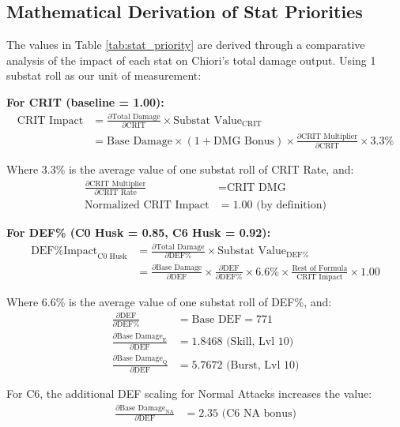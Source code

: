 \documentclass[12pt,a4paper]{article}
\begin{document}
\subsection{Mathematical Derivation of Stat Priorities}

The values in Table \ref{tab:stat_priority} are derived through a comparative analysis of the impact of each stat on Chiori's total damage output. Using 1 substat roll as our unit of measurement:

\textbf{For CRIT (baseline = 1.00):}
\begin{align}
\text{CRIT Impact} &= \frac{\partial \text{Total Damage}}{\partial \text{CRIT}} \times \text{Substat Value}_{\text{CRIT}} \\
&= \text{Base Damage} \times (1 + \text{DMG Bonus}) \times \frac{\partial \text{CRIT Multiplier}}{\partial \text{CRIT}} \times 3.3\%
\end{align}

Where 3.3\% is the average value of one substat roll of CRIT Rate, and:
\begin{align}
\frac{\partial \text{CRIT Multiplier}}{\partial \text{CRIT Rate}} &= \text{CRIT DMG} \\
\text{Normalized CRIT Impact} &= 1.00 \text{ (by definition)}
\end{align}

\textbf{For DEF\% (C0 Husk = 0.85, C6 Husk = 0.92):}
\begin{align}
\text{DEF\% Impact}_{\text{C0 Husk}} &= \frac{\partial \text{Total Damage}}{\partial \text{DEF\%}} \times \text{Substat Value}_{\text{DEF\%}} \\
&= \frac{\partial \text{Base Damage}}{\partial \text{DEF}} \times \frac{\partial \text{DEF}}{\partial \text{DEF\%}} \times 6.6\% \times \frac{\text{Rest of Formula}}{\text{CRIT Impact}} \times 1.00
\end{align}

Where 6.6\% is the average value of one substat roll of DEF\%, and:
\begin{align}
\frac{\partial \text{DEF}}{\partial \text{DEF\%}} &= \text{Base DEF} = 771 \\
\frac{\partial \text{Base Damage}_{\text{E}}}{\partial \text{DEF}} &= 1.8468 \text{ (Skill, Lvl 10)} \\
\frac{\partial \text{Base Damage}_{\text{Q}}}{\partial \text{DEF}} &= 5.7672 \text{ (Burst, Lvl 10)}
\end{align}

For C6, the additional DEF scaling for Normal Attacks increases the value:
\begin{align}
\frac{\partial \text{Base Damage}_{\text{NA}}}{\partial \text{DEF}} &= 2.35 \text{ (C6 NA bonus)}
\end{align}
\end{document}
